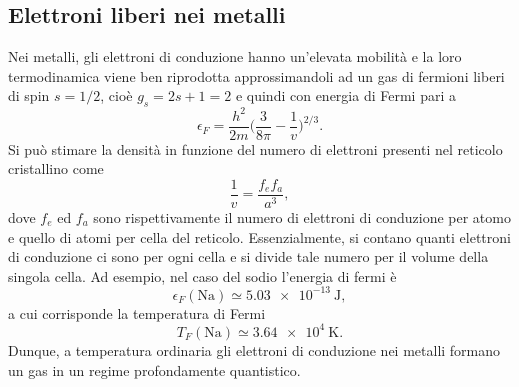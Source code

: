 \subsection{Elettroni liberi nei metalli}
Nei metalli, gli elettroni di conduzione hanno un'elevata mobilità e la loro termodinamica viene ben riprodotta approssimandoli ad un gas di fermioni liberi di spin $s = 1/2$, cioè $g_s = 2s + 1 = 2$ e quindi con energia di Fermi pari a 
\begin{equation}
    \epsilon_F = \frac{h^2}{2m}\bigg(\frac{3}{8\pi} - \frac{1}{v}\bigg)^{2/3}.
\end{equation}
Si può stimare la densità in funzione del numero di elettroni presenti nel reticolo cristallino come
\begin{equation}
    \frac{1}{v} = \frac{f_ef_a}{a^3},
\end{equation}
dove $f_e$ ed $f_a$ sono rispettivamente il numero di elettroni di conduzione per atomo e quello di atomi per cella del reticolo. Essenzialmente, si contano quanti elettroni di conduzione ci sono per ogni cella e si divide tale numero per il volume della singola cella. Ad esempio, nel caso del sodio l'energia di fermi è
\begin{equation}
    \epsilon_F(\mathrm{Na}) \simeq \SI{5.03e-13}{\joule},
\end{equation}
a cui corrisponde la temperatura di Fermi
\begin{equation}
    T_F(\mathrm{Na}) \simeq \SI{3.64e4}{\kelvin}.
\end{equation}
Dunque, a temperatura ordinaria gli elettroni di conduzione nei metalli formano un gas in un regime profondamente quantistico.

